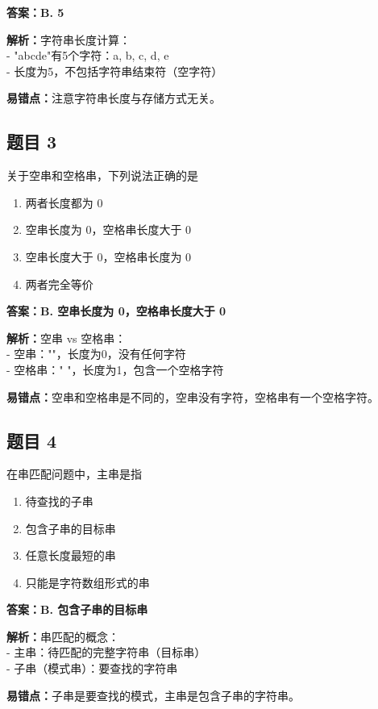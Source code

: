 \documentclass[12pt,a4paper]{ctexart}
\begin{document}
\begin{answerbox}
	\textbf{答案：B. 5}

	\textbf{解析：}字符串长度计算：\\
	- "abcde"有5个字符：a, b, c, d, e\\
	- 长度为5，不包括字符串结束符（空字符）

	\textbf{易错点：}注意字符串长度与存储方式无关。
\end{answerbox}

\subsection*{题目 3}
关于空串和空格串，下列说法正确的是
\begin{enumerate}[label=\Alph*.]
	\item 两者长度都为 0
	\item 空串长度为 0，空格串长度大于 0
	\item 空串长度大于 0，空格串长度为 0
	\item 两者完全等价
\end{enumerate}

\begin{answerbox}
	\textbf{答案：B. 空串长度为 0，空格串长度大于 0}

	\textbf{解析：}空串 vs 空格串：\\
	- 空串：""，长度为0，没有任何字符\\
	- 空格串：" "，长度为1，包含一个空格字符

	\textbf{易错点：}空串和空格串是不同的，空串没有字符，空格串有一个空格字符。
\end{answerbox}

\subsection*{题目 4}
在串匹配问题中，主串是指
\begin{enumerate}[label=\Alph*.]
	\item 待查找的子串
	\item 包含子串的目标串
	\item 任意长度最短的串
	\item 只能是字符数组形式的串
\end{enumerate}

\begin{answerbox}
	\textbf{答案：B. 包含子串的目标串}

	\textbf{解析：}串匹配的概念：\\
	- 主串：待匹配的完整字符串（目标串）\\
	- 子串（模式串）：要查找的字符串

	\textbf{易错点：}子串是要查找的模式，主串是包含子串的字符串。
\end{answerbox}
\end{document}
